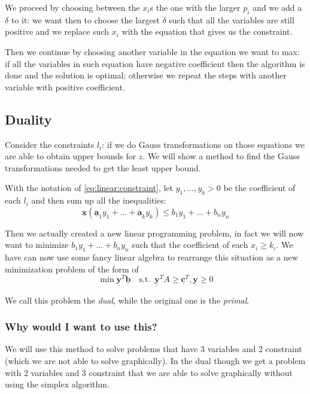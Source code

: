 \documentclass[14pt]{extarticle}
\renewcommand{\vec}[1]{\underline{\mathbf{#1}}}
\begin{document}
We proceed by choosing between the $x_i$s the one with the larger $p_i$ and we add a $\delta$ to it: we want then to choose the largest $\delta$ such that all the variables are still positive and we replace such $x_i$ with the equation that gives us the constraint.

Then we continue by choosing another variable in the equation we want to max:
if all the variables in such equation have negative coefficient then the algorithm is done and the solution is optimal;
otherwise we repeat the steps with another variable with positive coefficient.

\subsection{Duality}

Consider the constraints $l_i$: if we do Gauss transformations on those equations we are able to obtain upper bounds for $z$.
We will show a method to find the Gauss transformations needed to get the least upper bound.

With the notation of \autoref{eq:linear:constraint}, let $y_1, \ldots, y_k > 0$ be the coefficient of each $l_i$ and then sum up all the inequalities:
\begin{equation}
    \vec x (\vec a_1 y_1 + \dots + \vec a_k y_k) \leq b_1 y_1 + \dots + b_n y_n
\end{equation}

Then we actually created a new linear programming problem, in fact we will now want to minimize $b_1 y_1 + \dots + b_n y_n$ such that
the coefficient of each $x_i \geq k_i$.
We have can now use some fancy linear algebra to rearrange this situation as a new minimization problem of the form of
\begin{equation}
    \min \vec y^T \vec b \quad \text{s.t.} \enspace \vec y^T A \geq \vec c^T, \vec y \geq 0
\end{equation}

We call this problem the \emph{dual}, while the original one is the \emph{primal}.

\subsubsection{Why would I want to use this?}

We will use this method to solve problems that have 3 variables and 2 constraint (which we are not able to solve graphically).
In the dual though we get a problem with 2 variables and 3 constraint that we are able to solve graphically without using the simplex algorithm.
\end{document}
